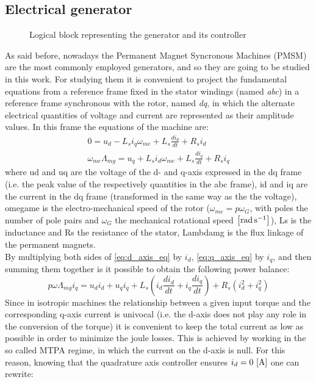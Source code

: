 \subsection{Electrical generator}\label{subsec:electrical_generator_description}
\begin{figure}[htb]
  \centering
  
  \caption{Logical block representing the generator and its controller}
  \label{fig:d_generator_block}
\end{figure}

As said before, nowadays the Permanent Magnet Syncronous Machines (PMSM) are the most commonly employed generators, and so they are going to be studied in this work. For studying them it is convenient to project the fundamental equations from a reference frame fixed in the stator windings (named \textit{abc}) in a reference frame synchronous with the rotor, named \textit{dq}, in which the alternate electrical quantities of voltage and current are represented as their amplitude values. 
In this frame the equations of the machine are:
\begin{gather}
  0=u_d-L_{s}i_q\omega_{me}+L_{s}\frac{di_d}{dt}+R_{s}i_d 
  \label{eq:d_axis_eq}\\
  \omega_{me}\Lambda_{mg}=u_q+L_{s}i_d\omega_{me}+L_{s}\frac{di_q}{dt}+R_{s}i_q
  \label{eq:q_axis_eq}
\end{gather}
where \acrshort{ud} and \acrshort{uq} are the voltage of the d- and q-axis expressed in the dq frame (i.e. the peak value of the respectively quantities in the abc frame), \acrshort{id} and \acrshort{iq} are the current in the dq frame (transformed in the same way as the the voltage), \acrshort{omegame} is the electro-mechanical speed of the rotor ($\omega_{me}=p\omega_G$, with \acrshort{poles} the number of pole pairs and $\omega_G$ the mechanical rotational speed $\left[\si{\radian \per \second}\right]$), \acrshort{Ls} is the inductance and \acrshort{Rs} the resistance of the stator, \acrshort{Lambdamg} is the flux linkage of the permanent magnets.\\
By multiplying both sides of \autoref{eq:d_axis_eq} by $i_d$, \autoref{eq:q_axis_eq} by $i_q$, and then summing them together is it possible to obtain the following power balance:
\begin{equation}
  p\omega\Lambda_{mg}i_q=u_di_d + u_qi_q+ L_{s}\left(i_d\frac{di_d}{dt} + i_q\frac{di_q}{dt}\right) + R_{s}(i_d^2 + i_q^2)
  \label{eq:gen_power_balance}
\end{equation}
Since in isotropic machines the relationship between a given input torque and the corresponding q-axis current is univocal (i.e. the d-axis does not play any role in the conversion of the torque) it is convenient to keep the total current as low as possible in order to minimize the joule losses. This is achieved by working in the so called \acrfull{MTPA} regime, in which the current on the d-axis is null. For this reason, knowing that the quadrature axis controller ensures $i_d=0 \, \left[\si{\ampere}\right]$ one can rewrite:
